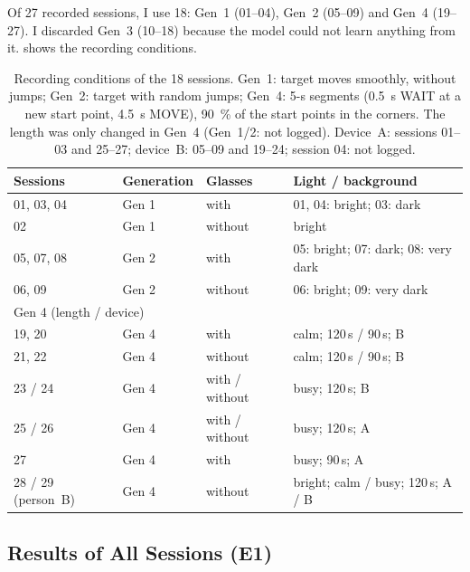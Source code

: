 Of 27 recorded sessions, I use 18: Gen~1 (01--04), Gen~2 (05--09) and Gen~4
(19--27). I discarded Gen~3 (10--18) because the model could not learn anything
from it.  shows the recording conditions.

\begin{table}[htbp]
  \centering
  \caption[Recording conditions of the 18 sessions]{Recording conditions of the 18 sessions. Gen~1: target moves
           smoothly, without jumps; Gen~2: target with random jumps; Gen~4:
           5-s segments (\SI{0.5}{\second} WAIT at a new start point,
           \SI{4.5}{\second} MOVE), \SI{90}{\percent} of the start points in the
           corners. The length was only changed in Gen~4 (Gen~1/2: not
           logged). Device~A: sessions 01--03 and 25--27; device~B: 05--09
           and 19--24; session 04: not logged.}
  \label{tab:session_conditions}
  \small
  \begin{tabular}{llll}
    \toprule
    Sessions & Generation & Glasses & Light / background \\
    \midrule
    01, 03, 04 & Gen 1 & with    & 01, 04: bright; 03: dark \\
    02         & Gen 1 & without & bright \\
    05, 07, 08 & Gen 2 & with    & 05: bright; 07: dark; 08: very dark \\
    06, 09     & Gen 2 & without & 06: bright; 09: very dark \\
    \midrule
    \multicolumn{4}{l}{Gen 4 \quad (length / device)} \\
    19, 20 & Gen 4 & with    & calm; 120\,s / 90\,s; B \\
    21, 22 & Gen 4 & without & calm; 120\,s / 90\,s; B \\
    23 / 24 & Gen 4 & with / without & busy; 120\,s; B \\
    25 / 26 & Gen 4 & with / without & busy; 120\,s; A \\
    27     & Gen 4 & with    & busy; 90\,s; A \\
        \midrule
    28 / 29 (person~B) & Gen 4 & without & bright; calm / busy; 120\,s; A / B \\
    \bottomrule
  \end{tabular}
\end{table}

\subsection{Results of All Sessions (E1)}
\label{sec:sessions_results}

